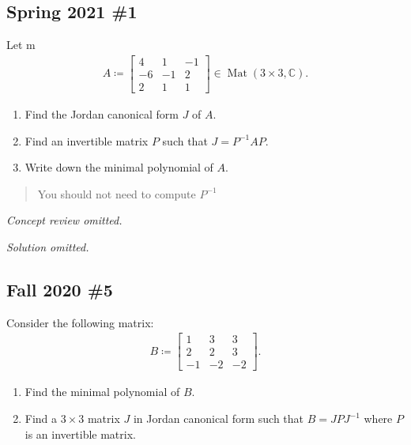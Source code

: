\hypertarget{spring-2021-1}{%
\subsection{Spring 2021 \#1}\label{spring-2021-1}}

Let m
\begin{align*}
A \coloneqq
\begin{bmatrix}
4 & 1 & -1 \\
-6 & -1 & 2 \\
2 & 1 & 1
\end{bmatrix}
\in \operatorname{Mat}(3\times 3, {\mathbb{C}})
.\end{align*}

\begin{enumerate}
\def\labelenumi{\alph{enumi}.}
\item
  Find the Jordan canonical form \(J\) of \(A\).
\item
  Find an invertible matrix \(P\) such that \(J = P ^{-1}A P\).
\item
  Write down the minimal polynomial of \(A\).
\end{enumerate}

\begin{quote}
You should not need to compute \(P^{-1}\)
\end{quote}

\emph{Concept review omitted.}

\emph{Solution omitted.}

\hypertarget{fall-2020-5}{%
\subsection{Fall 2020 \#5}\label{fall-2020-5}}

Consider the following matrix:
\begin{align*}
B \coloneqq
\begin{bmatrix}
1 & 3 & 3
\\
2 & 2 & 3
\\
-1 & -2 & -2
\end{bmatrix}
.\end{align*}

\begin{enumerate}
\def\labelenumi{\alph{enumi}.}
\item
  Find the minimal polynomial of \(B\).
\item
  Find a \(3\times 3\) matrix \(J\) in Jordan canonical form such that
  \(B = JPJ^{-1}\) where \(P\) is an invertible matrix.
\end{enumerate}

